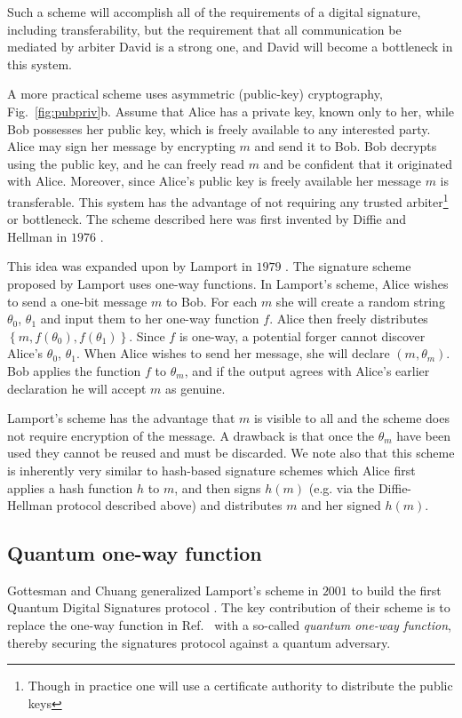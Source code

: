 Such a scheme will accomplish all of the requirements of a digital signature, including transferability, but the requirement that all communication be mediated by arbiter David is a strong one, and David will become a bottleneck in this system.

A more practical scheme uses asymmetric (public-key) cryptography, Fig.~\ref{fig:pubpriv}b. Assume that Alice has a private key, known only to her, while Bob possesses her public key, which is freely available to any interested party. Alice may sign her message by encrypting $m$ and send it to Bob. Bob decrypts using the public key, and he can freely read $m$ and be confident that it originated with Alice. Moreover, since Alice's public key is freely available her message $m$ is transferable. This system has the advantage of not requiring any trusted arbiter\footnote{Though in practice one will use a certificate authority to distribute the public keys} or bottleneck. The scheme described here was first invented by Diffie and Hellman in $1976$ \cite{Hellman1976}.

This idea was expanded upon by Lamport in $1979$ \cite{Lamport1979}. The signature scheme proposed by Lamport uses one-way functions. In Lamport's scheme, Alice wishes to send a one-bit message $m$ to Bob. For each $m$ she will create a random string $\theta_0$, $\theta_1$ and input them to her one-way function $f$. Alice then freely distributes $\left\{m, f\left(\theta_0\right), f\left(\theta_1\right)\right\}$. Since $f$ is one-way, a potential forger cannot discover Alice's $\theta_0$, $\theta_1$. When Alice wishes to send her message, she will declare $\left(m, \theta_m\right)$. Bob applies the function $f$ to $\theta_m$, and if the output agrees with Alice's earlier declaration he will accept $m$ as genuine. 

Lamport's scheme has the advantage that $m$ is visible to all and the scheme does not require encryption of the message. A drawback is that once the $\theta_m$ have been used they cannot be reused and must be discarded. We note also that this scheme is inherently very similar to hash-based signature schemes which Alice first applies a hash function $h$ \cite{Schneier1996} to $m$, and then signs $h\left(m\right)$ (e.g. via the Diffie-Hellman protocol described above) and distributes $m$ and her signed $h\left(m\right)$.



\subsection{Quantum one-way function}
Gottesman and Chuang \cite{Gottesman2001} generalized Lamport's scheme \cite{Lamport1979} in $2001$ to build the first Quantum Digital Signatures protocol \cite{Gottesman2001}. The key contribution of their scheme is to replace the one-way function in Ref.~\cite{Lamport1979} with a so-called \emph{quantum one-way function}, thereby securing the signatures protocol against a quantum adversary.


